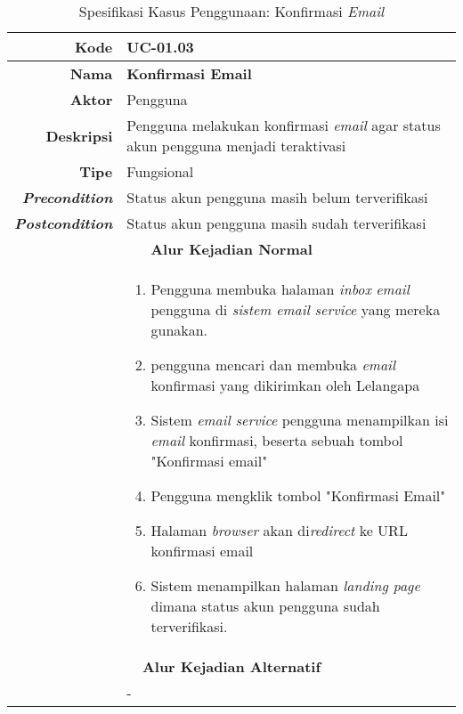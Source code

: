 \begin{table}[H]
	\centering
	\caption{Spesifikasi Kasus Penggunaan: Konfirmasi \textit{Email}}
	\label{uc01.03}
	\begin{tabular}{|r|p{8cm}|}
		\hline
		\textbf{Kode}                                                    & 	UC-01.03                                                     \\ \hline
		\textbf{Nama}                                                    & \textbf{Konfirmasi Email}                                         \\ \hline
		\textbf{Aktor}
			& Pengguna                                                    \\ \hline
		\textbf{Deskripsi}                                               & Pengguna melakukan konfirmasi \textit{email} agar status akun pengguna menjadi teraktivasi \\ \hline
		\textbf{Tipe}
			& Fungsional                                                  \\ \hline
		\textbf{\textit{Precondition}}
			& Status akun pengguna masih belum terverifikasi \\ \hline
		\textbf{\textit{Postcondition}} 
			&  Status akun pengguna masih sudah	 terverifikasi \\ \hline
		\multicolumn{2}{|c|}{\textbf{Alur Kejadian Normal}}                                                                            \\ \hline
		\multicolumn{1}{|l|}{}                                           & 
			\begin{enumerate}
				\item Pengguna membuka halaman \textit{inbox} \textit{email} pengguna di \textit{sistem \textit{email} service} yang mereka gunakan.
				\item pengguna mencari dan membuka \textit{email} konfirmasi yang dikirimkan oleh Lelangapa
				\item Sistem \textit{email service} pengguna menampilkan isi \textit{email} konfirmasi, beserta sebuah tombol "Konfirmasi email"
				\item Pengguna mengklik tombol "Konfirmasi Email"
				\item Halaman \textit{browser} akan di\textit{redirect} ke URL konfirmasi email
				\item Sistem menampilkan halaman \textit{landing page} dimana status akun pengguna sudah terverifikasi.
			\end{enumerate}
		\\ \hline
		\multicolumn{2}{|c|}{\textbf{Alur Kejadian Alternatif}}                                                         \\ \hline
		\multicolumn{1}{|l|}{}                                           & -
		\\ \hline
	\end{tabular}
\end{table}